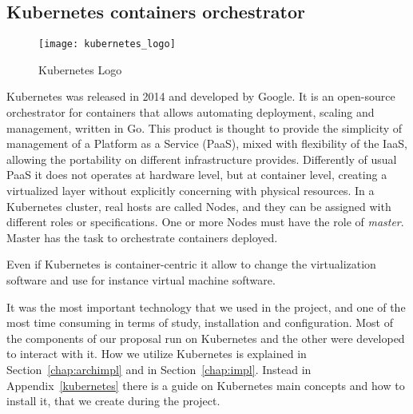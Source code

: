 \subsection{Kubernetes containers orchestrator}
\begin{figure}[h]
  \centering \texttt{[image: kubernetes\_logo]}
  \caption{Kubernetes Logo}
  \label{chap:intro:img:k8s_logo}
\end{figure}
Kubernetes was released in 2014 and developed by Google. It is an open-source
orchestrator for containers that allows automating deployment, scaling and
management, written in Go. This product is thought to provide the simplicity of
management of a Platform as a Service (PaaS), mixed with flexibility of the
IaaS, allowing the portability on different infrastructure provides. Differently
of usual PaaS it does not operates at hardware level, but at container level,
creating a virtualized layer without explicitly concerning with physical
resources. In a Kubernetes cluster, real hosts are called Nodes, and they can be
assigned with different roles or specifications. One or more Nodes must have the
role of \emph{master}. Master has the task to orchestrate containers deployed. 

Even if Kubernetes is container-centric it allow to change the virtualization
software and use for instance virtual machine software.

It was the most important technology that we used in the project, and one of the
most time consuming in terms of study, installation and configuration. Most of
the components of our proposal run on Kubernetes and the other were developed to
interact with it. How we utilize Kubernetes is explained in
Section~\ref{chap:archimpl} and in Section~\ref{chap:impl}. Instead in
Appendix~\ref{kubernetes} there is a guide on Kubernetes main concepts and how
to install it, that we create during the project.

